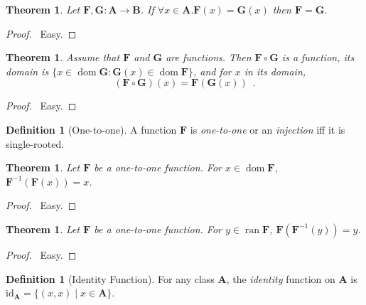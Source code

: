 \documentclass{report}
\let\qed\relax
\newtheorem{theorem}[axiom]{Theorem}
\theoremstyle{definition}
\newtheorem{definition}[axiom]{Definition}
\newcommand{\dom}{\ensuremath{\operatorname{dom}}}
\newcommand{\inv}[1]{\ensuremath{{#1}^{-1}}}
\newcommand{\ran}{\ensuremath{\operatorname{ran}}}
\begin{document}
    \begin{theorem}
        Let $\mathbf{F}, \mathbf{G} : \mathbf{A} \rightarrow \mathbf{B}$. If $\forall x \in \mathbf{A}.
        \mathbf{F}(x) = \mathbf{G}(x)$ then $\mathbf{F} = \mathbf{G}$.
    \end{theorem}

    \begin{proof}
        \pf\ Easy. \qed
    \end{proof}

    \begin{theorem}
        Assume that $\mathbf{F}$ and $\mathbf{G}$ are functions. Then $\mathbf{F} \circ \mathbf{G}$
        is a function, its domain is $\{ x \in \dom \mathbf{G} : \mathbf{G}(x) \in \dom \mathbf{F} \}$,
        and for $x$ in its domain,
        \[ (\mathbf{F} \circ \mathbf{G})(x) = \mathbf{F}(\mathbf{G}(x)) \enspace . \]
    \end{theorem}

    \begin{proof}
        \pf\ Easy. \qed
    \end{proof}

    \begin{definition}[One-to-one]
        A function $\mathbf{F}$ is \emph{one-to-one} or an \emph{injection} iff it is single-rooted.
    \end{definition}

    \begin{theorem}
        Let $\mathbf{F}$ be a one-to-one function. For $x \in \dom \mathbf{F}$, $\inv{\mathbf{F}}(\mathbf{F}(x)) = x$.
    \end{theorem}

    \begin{proof}
        \pf\ Easy. \qed
    \end{proof}

    \begin{theorem}
        Let $\mathbf{F}$ be a one-to-one function. For $y \in \ran \mathbf{F}$, $\mathbf{F}(\inv{\mathbf{F}}(y)) = y$.
    \end{theorem}

    \begin{proof}
        \pf\ Easy. \qed
    \end{proof}

    \begin{definition}[Identity Function]
        For any class $\mathbf{A}$, the \emph{identity} function on $\mathbf{A}$ is $\mathrm{id}_\mathbf{A} =
        \{ (x,x) \mid x \in \mathbf{A} \}$.
    \end{definition}
\end{document}
